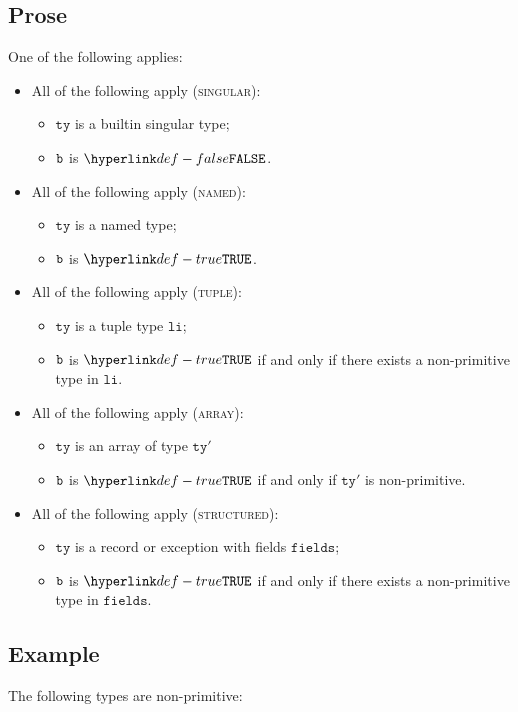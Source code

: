 \documentclass{book}
\newcommand\tty[0]{\texttt{ty}}
\newcommand\fields[0]{\texttt{fields}}
\newcommand\vli[0]{\texttt{li}}
\begin{document}
\subsection{Prose}
One of the following applies:
\begin{itemize}
  \item All of the following apply (\textsc{singular}):
  \begin{itemize}
  \item $\tty$ is a builtin singular type;
  \item $\texttt{b}$ is $\False$.
  \end{itemize}
  \item All of the following apply (\textsc{named}):
  \begin{itemize}
    \item $\tty$ is a named type;
    \item $\texttt{b}$ is $\True$.
  \end{itemize}
  \item All of the following apply (\textsc{tuple}):
  \begin{itemize}
    \item $\tty$ is a tuple type $\vli$;
    \item $\texttt{b}$ is $\True$ if and only if there exists a non-primitive type in $\vli$.
  \end{itemize}
  \item All of the following apply (\textsc{array}):
    \begin{itemize}
    \item $\tty$ is an array of type $\tty'$
    \item $\texttt{b}$ is $\True$ if and only if $\tty'$ is non-primitive.
    \end{itemize}
  \item All of the following apply (\textsc{structured}):
    \begin{itemize}
    \item $\tty$ is a record or exception with fields $\fields$;
    \item $\texttt{b}$ is $\True$ if and only if there exists a non-primitive type in $\fields$.
    \end{itemize}
\end{itemize}

\subsection{Example}
The following types are non-primitive:
\end{document}
